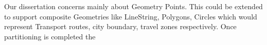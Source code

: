 \documentclass[article,type=msc,colorback,12pt,accentcolor=tud1d]{tudthesis}
\begin{document}
	   	   \par Our dissertation concerns mainly about Geometry Points. This could be extended to support composite Geometries like LineString, Polygons, Circles which would represent Transport routes, city boundary, travel zones respectively.
	   	   Once partitioning is completed the
   	  
   	   
  \cleardoublepage
 
 \clearpage
 
 
 	  
\end{document}

